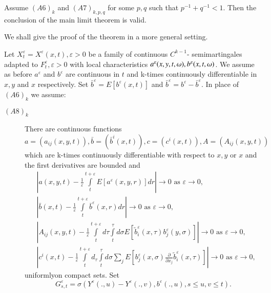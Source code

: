 \setcounter{theorem}{4}
\begin{theorem}\label{c3:thm3.10.5} %
  Assume $(A6)_k$ and $(A7)_{k,p,q}$ for some $p,q$ such that $p^{-1}+
  q^{-1} < 1$. Then the conclusion of the main limit theorem is valid. 

  We shall give the proof of the theorem in a more general setting.

  Let $X^{\varepsilon}_t = X^{\varepsilon}(x,t), \varepsilon >0$ be a
  family of continuous $C^{k-1}$- semimartingales adapted to
  $F^{\varepsilon}_t, \varepsilon >0$ with local characteristics
  $a^{\varepsilon}(x,y,t,\omega),\break b^{\varepsilon}(x,t,\omega)$. We
  assume as before $a^{\varepsilon}$ and $b^{\varepsilon}$ are
  continuous in $t$ and k-times continuously differentiable in $x,y$
  and $x$ respectively. Set $\bar{b}^{\varepsilon} = E[
    b^{\varepsilon} (x,t)]$ and
  $\bar{b}^{\varepsilon} = b^{\varepsilon} -
  \bar{b}^{\varepsilon}$. In   place of $(A6)_k$ we assume:   
  \begin{description}
  \item [$(A8)_k$] There are continuous functions $a=(a_{ij}(x,y,t)),
    \bar{b} = (\bar{b}^i(x,t)), c=(c^i(x,t)), A= (A_{ij}(x,y,t))$
    which are k-times continuously differentiable with respect to
    $x,y$ or $x$ and the first derivatives are bounded and  
    \begin{align*}
      & |a(x,y,t) - \frac{1}{\varepsilon} \int \limits^{t+
        \varepsilon}_t E[a^{\varepsilon}(x,y,r)]dr| \to 0 \text{ as }
      \varepsilon \to 0,\\ 
      & | \bar{b}(x,t) - \frac{1}{\varepsilon} \int \limits^{t+
        \varepsilon}_t \bar{b}^{\varepsilon}(x,r) dr| \to 0 \text{ as }
      \varepsilon \to 0,\\ 
      &|A_{ij}(x,y,t) - \frac{1}{\varepsilon} \int \limits^{t+
        \varepsilon}_t d \tau \int \limits^{\tau}_t d \sigma
      E[\tilde{b}^{\varepsilon}_i (x, \tau)b^{\varepsilon}_j (y,
        \sigma)]|\to 0 \text{ as } \varepsilon \to 0,\\ 
      &| c^i(x,t) - \frac{1}{\varepsilon} \int \limits^{t+
        \varepsilon}_t d_{\tau} \int \limits^{\tau}_t d \sigma \sum_j
      E[b^{\varepsilon}_j (x, \sigma) \frac{\partial}{\partial x_j}
        \tilde{b}^{\varepsilon}_i(x, \tau)]|\to 0 \text{ as }
      \varepsilon \to 0, 
    \end{align*}
    uniformly\pageoriginale on compact sets.
    \noindent
    Set 
    $$
    G^{\varepsilon}_{s,t} =
    \sigma(Y^{\varepsilon}(.,u)-Y^{\varepsilon}(.,v),b^{\varepsilon}(.,u), 
    s \leq u, v \leq t). 
    $$


\end{description}
\end{theorem}
